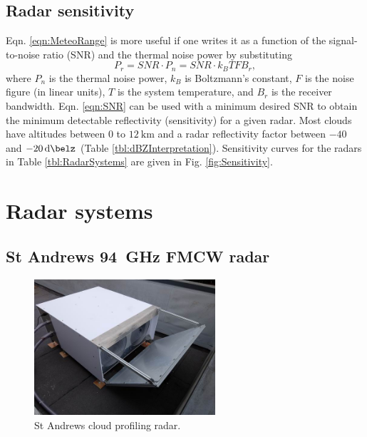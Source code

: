 \documentclass{article}
\begin{document}
\subsection{Radar sensitivity}
Eqn. \ref{eqn:MeteoRange} is more useful if one writes it as a function of the signal-to-noise ratio (SNR) and the thermal noise power by substituting
\begin{equation}
	P_r = SNR \cdot P_n = SNR \cdot k_B T F B_r,
	\label{eqn:SNR}
\end{equation}
where \(P_n\) is the thermal noise power, \(k_B\) is Boltzmann's constant, \(F\) is the noise figure (in linear units), \(T\) is the system temperature, and \(B_r\) is the receiver bandwidth.\supercite{RadarHandbookMeteo}
Eqn. \ref{eqn:SNR} can be used with a minimum desired SNR to obtain the minimum detectable reflectivity (sensitivity) for a given radar. Most clouds have altitudes between \(0\) to \(\SI{12}{\kilo\metre}\) and a radar reflectivity factor between \(-40\) and \(-\SI{20}{\deci\belz}\)\supercite{Gorka} (Table \ref{tbl:dBZInterpretation}).
Sensitivity curves for the radars in Table \ref{tbl:RadarSystems} are given in Fig. \ref{fig:Sensitivity}.

\section{Radar systems}
\subsection{St Andrews \SI{94}{\giga\hertz} FMCW radar}
\begin{figure}
	\centering
	\includegraphics[width=0.6\textwidth]{cloud-radar}
	\caption{St Andrews cloud profiling radar.\supercite{StAndrewsRadarImage}}
	\label{fig:RadarImage}
\end{figure}
\end{document}
